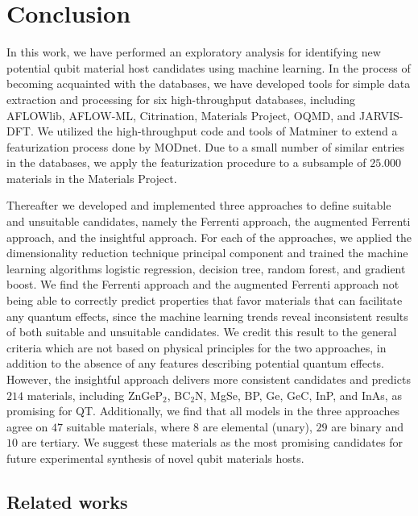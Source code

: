 \chapter*{Conclusion}

In this work, we have performed an exploratory analysis for identifying new potential qubit material host candidates using machine learning. In the process of becoming acquainted with the databases, we have developed tools for simple data extraction and processing for six high-throughput databases, including AFLOWlib, AFLOW-ML, Citrination, Materials Project, OQMD, and JARVIS-DFT. We utilized the high-throughput code and tools of Matminer to extend a featurization process done by MODnet. Due to a small number of similar entries in the databases, we apply the featurization procedure to a subsample of $25.000$ materials in the Materials Project.

Thereafter we developed and implemented three approaches to define suitable and unsuitable candidates, namely the Ferrenti approach, the augmented Ferrenti approach, and the insightful approach. For each of the approaches, we applied the dimensionality reduction technique principal component and trained the machine learning algorithms logistic regression, decision tree, random forest, and gradient boost. We find the Ferrenti approach and the augmented Ferrenti approach not being able to correctly predict properties that favor materials that can facilitate any quantum effects, since the machine learning trends reveal inconsistent results of both suitable and unsuitable candidates. We credit this result to the general criteria which are not based on physical principles for the two approaches, in addition to the absence of any features describing potential quantum effects. However, the insightful approach delivers more consistent candidates and predicts $214$ materials, including ZnGeP$_2$, BC$_2$N, MgSe, BP, Ge, GeC, InP, and InAs, as promising for QT. Additionally, we find that all models in the three approaches agree on $47$ suitable materials, where $8$ are elemental (unary), $29$ are binary and $10$ are tertiary. We suggest these materials as the most promising candidates for future experimental synthesis of novel qubit materials hosts. %
\clearpage

\section*{Related works}

